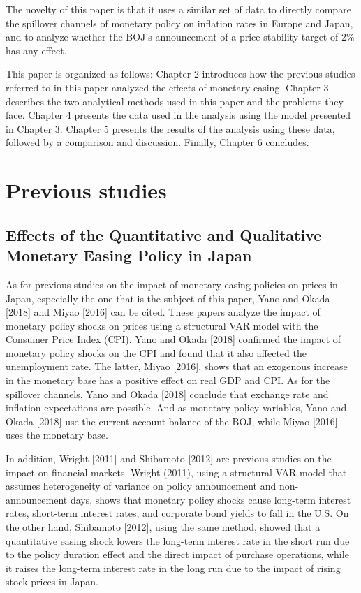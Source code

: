 \documentclass[12pt]{article}
\begin{document}
The novelty of this paper is that it uses a similar set of data to directly compare the spillover channels of monetary policy on inflation rates in Europe and Japan, and to analyze whether the BOJ's announcement of a price stability target of 2\% has any effect.

This paper is organized as follows: Chapter 2 introduces how the previous studies referred to in this paper analyzed the effects of monetary easing.
Chapter 3 describes the two analytical methods used in this paper and the problems they face. Chapter 4 presents the data used in the analysis using the model presented in Chapter 3. Chapter 5 presents the results of the analysis using these data, followed by a comparison and discussion. Finally, Chapter 6 concludes.

\newpage

\section{Previous studies}

\subsection{Effects of the Quantitative and Qualitative Monetary Easing Policy in Japan}

As for previous studies on the impact of monetary easing policies on prices in Japan, especially the one that is the subject of this paper, Yano and Okada [2018] and Miyao [2016] can be cited.
These papers analyze the impact of monetary policy shocks on prices using a structural VAR model with the Consumer Price Index (CPI).
Yano and Okada [2018] confirmed the impact of monetary policy shocks on the CPI and found that it also affected the unemployment rate. The latter, Miyao [2016], shows that an exogenous increase in the monetary base has a positive effect on real GDP and CPI.
As for the spillover channels, Yano and Okada [2018] conclude that exchange rate and inflation expectations are possible.
And as monetary policy variables, Yano and Okada [2018] use the current account balance of the BOJ, while Miyao [2016] uses the monetary base.

In addition, Wright [2011] and Shibamoto [2012] are previous studies on the impact on financial markets.
Wright (2011), using a structural VAR model that assumes heterogeneity of variance on policy announcement and non-announcement days, shows that monetary policy shocks cause long-term interest rates, short-term interest rates, and corporate bond yields to fall in the U.S.
On the other hand, Shibamoto [2012], using the same method, showed that a quantitative easing shock lowers the long-term interest rate in the short run due to the policy duration effect and the direct impact of purchase operations, while it raises the long-term interest rate in the long run due to the impact of rising stock prices in Japan.
\end{document}
